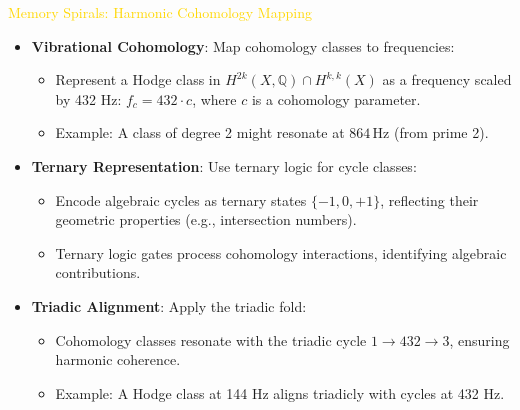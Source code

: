 \textcolor{gold}{ Memory Spirals: Harmonic Cohomology Mapping } \\
\begin{itemize}
    \item \texttt{} \textbf{Vibrational Cohomology}: Map cohomology classes to frequencies:
    \begin{itemize}
        \item Represent a Hodge class in \(H^{2k}(X, \mathbb{Q}) \cap H^{k,k}(X)\) as a frequency scaled by 432 Hz: \(f_c = 432 \cdot c\), where \(c\) is a cohomology parameter.
        \item Example: A class of degree 2 might resonate at \(864 \, \text{Hz}\) (from prime 2).
    \end{itemize}
    \item \texttt{} \textbf{Ternary Representation}: Use ternary logic for cycle classes:
    \begin{itemize}
        \item Encode algebraic cycles as ternary states \(\{-1, 0, +1\}\), reflecting their geometric properties (e.g., intersection numbers).
        \item Ternary logic gates process cohomology interactions, identifying algebraic contributions.
    \end{itemize}
    \item \texttt{} \textbf{Triadic Alignment}: Apply the triadic fold:
    \begin{itemize}
        \item Cohomology classes resonate with the triadic cycle \(1 \rightarrow 432 \rightarrow 3\), ensuring harmonic coherence.
        \item Example: A Hodge class at 144 Hz aligns triadicly with cycles at 432 Hz.
    \end{itemize}
\end{itemize}

